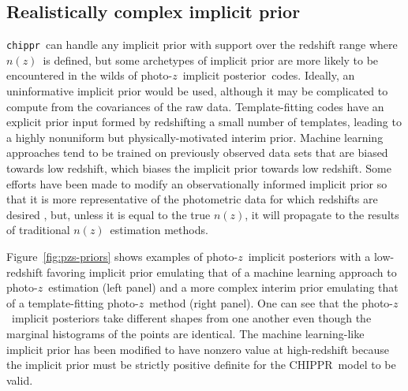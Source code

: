 \documentclass[iop]{emulateapj}
\newcommand{\Fig}[1]{Figure~\ref{#1}}
\newcommand{\project}[1]{\textsc{#1}}
\newcommand{\Chippr}{\project{CHIPPR}}%
\newcommand{\repo}[1]{\texttt{#1}}
\newcommand{\chippr}{\repo{chippr}}
\newcommand{\pz}{photo-$z$}
\newcommand{\pzip}{\pz\ implicit posterior}
\newcommand{\nz}{$n(z)$}
\begin{document}
\subsection{Realistically complex implicit prior}
\label{sec:interim}

\chippr\ can handle any implicit prior with support over the redshift range where \nz\ is defined, but some archetypes of implicit prior are more likely to be encountered in the wilds of \pzip\ codes.
Ideally, an uninformative implicit prior would be used, although it may be complicated to compute from the covariances of the raw data.
Template-fitting codes have an explicit prior input formed by redshifting a small number of templates, leading to a highly nonuniform but physically-motivated interim prior.
Machine learning approaches tend to be trained on previously observed data sets that are biased towards low redshift, which biases the implicit prior towards low redshift.
Some efforts have been made to modify an observationally informed implicit prior so that it is more representative of the photometric data for which redshifts are desired \citep{sheldon_photometric_2012}, but, unless it is equal to the true \nz, it will propagate to the results of traditional \nz\ estimation methods.

\Fig{fig:pzs-priors} shows examples of \pzip s with a low-redshift favoring implicit prior emulating that of a machine learning approach to \pz\ estimation (left panel) and a more complex interim prior emulating that of a template-fitting \pz\ method (right panel).
One can see that the \pzip s take different shapes from one another even though the marginal histograms of the points are identical.
The machine learning-like implicit prior has been modified to have nonzero value at high-redshift because the implicit prior must be strictly positive definite for the \Chippr\ model to be valid.
\end{document}
